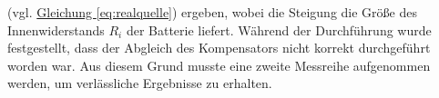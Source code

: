 (vgl. \hyperref[eq:realquelle]{Gleichung \ref*{eq:realquelle}}) ergeben, wobei die Steigung die Größe des Innenwiderstands $R_i$ der Batterie liefert.
Während der Durchführung wurde festgestellt, dass der Abgleich des Kompensators nicht korrekt durchgeführt worden war. Aus diesem Grund musste eine zweite Messreihe aufgenommen werden, um verlässliche Ergebnisse zu erhalten.
